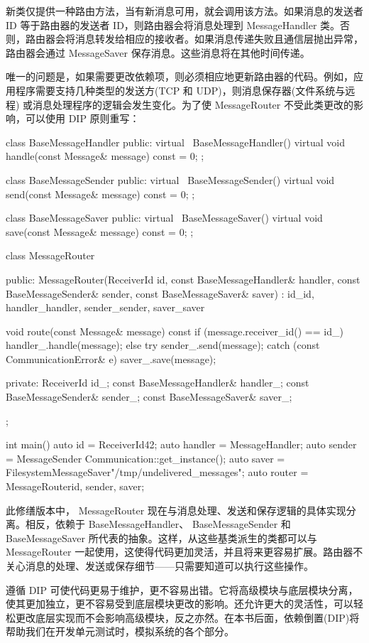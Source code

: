 新类仅提供一种路由方法，当有新消息可用，就会调用该方法。如果消息的发送者 ID 等于路由器的发送者 ID，则路由器会将消息处理到 MessageHandler 类。否则，路由器会将消息转发给相应的接收者。如果消息传递失败且通信层抛出异常，路由器会通过 MessageSaver 保存消息。这些消息将在其他时间传递。

唯一的问题是，如果需要更改依赖项，则必须相应地更新路由器的代码。例如，应用程序需要支持几种类型的发送方(TCP 和 UDP)，则消息保存器(文件系统与远程) 或消息处理程序的逻辑会发生变化。为了使 MessageRouter 不受此类更改的影响，可以使用 DIP 原则重写：

\begin{cpp}
class BaseMessageHandler {
public:
    virtual ~BaseMessageHandler() {}
    virtual void handle(const Message& message) const = 0;
};

class BaseMessageSender {
public:
    virtual ~BaseMessageSender() {}
    virtual void send(const Message& message) const = 0;
};

class BaseMessageSaver {
public:
    virtual ~BaseMessageSaver() {}
    virtual void save(const Message& message) const = 0;
};

class MessageRouter {
public:
    MessageRouter(ReceiverId id,
                  const BaseMessageHandler& handler,
                  const BaseMessageSender& sender,
                  const BaseMessageSaver& saver)
        : id_{id}, handler_{handler}, sender_{sender},
            saver_{saver} {}

    void route(const Message& message) const {
        if (message.receiver_id() == id_) {
            handler_.handle(message);
        } else {
            try {
                sender_.send(message);
            } catch (const CommunicationError& e) {
                saver_.save(message);
            }
        }
    }

private:
    ReceiverId id_;
    const BaseMessageHandler& handler_;
    const BaseMessageSender& sender_;
    const BaseMessageSaver& saver_;
};

int main() {
    auto id = ReceiverId{42};
    auto handler = MessageHandler{};
    auto sender = MessageSender{
        Communication::get_instance()};
    auto saver =
        FilesystemMessageSaver{"/tmp/undelivered_messages"};
    auto router = MessageRouter{id, sender, saver};
}
\end{cpp}

此修缮版本中， MessageRouter 现在与消息处理、发送和保存逻辑的具体实现分离。相反，依赖于 BaseMessageHandler、 BaseMessageSender 和 BaseMessageSaver 所代表的抽象。这样，从这些基类派生的类都可以与 MessageRouter 一起使用，这使得代码更加灵活，并且将来更容易扩展。路由器不关心消息的处理、发送或保存细节——只需要知道可以执行这些操作。

遵循 DIP 可使代码更易于维护，更不容易出错。它将高级模块与底层模块分离，使其更加独立，更不容易受到底层模块更改的影响。还允许更大的灵活性，可以轻松更改底层实现而不会影响高级模块，反之亦然。在本书后面，依赖倒置(DIP)将帮助我们在开发单元测试时，模拟系统的各个部分。
























